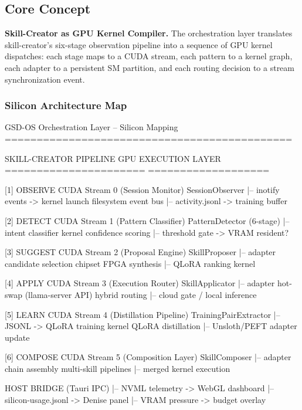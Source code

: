 \documentclass[11pt,letterpaper]{article}
\begin{document}
\subsection{Core Concept}

\textbf{Skill-Creator as GPU Kernel Compiler.} The orchestration layer translates skill-creator's six-stage observation pipeline into a sequence of GPU kernel dispatches: each stage maps to a CUDA stream, each pattern to a kernel graph, each adapter to a persistent SM partition, and each routing decision to a stream synchronization event.

\subsubsection{Silicon Architecture Map}

\begin{asciibox}
GSD-OS Orchestration Layer -- Silicon Mapping
=============================================

SKILL-CREATOR PIPELINE        GPU EXECUTION LAYER
======================        ===================

[1] OBSERVE                   CUDA Stream 0 (Session Monitor)
    SessionObserver            |-- inotify events -> kernel launch
    filesystem event bus       |-- activity.jsonl -> training buffer

[2] DETECT                    CUDA Stream 1 (Pattern Classifier)
    PatternDetector (6-stage)  |-- intent classifier kernel
    confidence scoring         |-- threshold gate -> VRAM resident?

[3] SUGGEST                   CUDA Stream 2 (Proposal Engine)
    SkillProposer              |-- adapter candidate selection
    chipset FPGA synthesis     |-- QLoRA ranking kernel

[4] APPLY                     CUDA Stream 3 (Execution Router)
    SkillApplicator            |-- adapter hot-swap (llama-server API)
    hybrid routing             |-- cloud gate / local inference

[5] LEARN                     CUDA Stream 4 (Distillation Pipeline)
    TrainingPairExtractor      |-- JSONL -> QLoRA training kernel
    QLoRA distillation         |-- Unsloth/PEFT adapter update

[6] COMPOSE                   CUDA Stream 5 (Composition Layer)
    SkillComposer              |-- adapter chain assembly
    multi-skill pipelines      |-- merged kernel execution

                               HOST BRIDGE (Tauri IPC)
                               |-- NVML telemetry -> WebGL dashboard
                               |-- silicon-usage.jsonl -> Denise panel
                               |-- VRAM pressure -> budget overlay
\end{asciibox}
\end{document}
